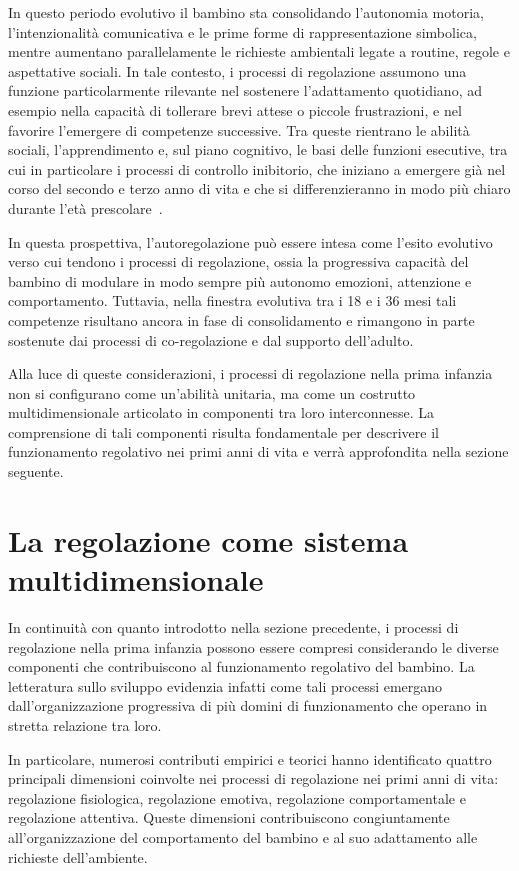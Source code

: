         In questo periodo evolutivo il bambino sta consolidando l'autonomia motoria, l'intenzionalità comunicativa e le prime forme di rappresentazione simbolica, mentre aumentano parallelamente le richieste ambientali legate a routine, regole e aspettative sociali. In tale contesto, i processi di regolazione assumono una funzione particolarmente rilevante nel sostenere l'adattamento quotidiano, ad esempio nella capacità di tollerare brevi attese o piccole frustrazioni, e nel favorire l'emergere di competenze successive. Tra queste rientrano le abilità sociali, l'apprendimento e, sul piano cognitivo, le basi delle funzioni esecutive, tra cui in particolare i processi di controllo inibitorio, che iniziano a emergere già nel corso del secondo e terzo anno di vita e che si differenzieranno in modo più chiaro durante l'età prescolare~\cite{diamond2013,blair2015,gandolfi2014}.

        In questa prospettiva, l'autoregolazione può essere intesa come l'esito evolutivo verso cui tendono i processi di regolazione, ossia la progressiva capacità del bambino di modulare in modo sempre più autonomo emozioni, attenzione e comportamento. Tuttavia, nella finestra evolutiva tra i 18 e i 36 mesi tali competenze risultano ancora in fase di consolidamento e rimangono in parte sostenute dai processi di co-regolazione e dal supporto dell'adulto.

        Alla luce di queste considerazioni, i processi di regolazione nella prima infanzia non si configurano come un'abilità unitaria, ma come un costrutto multidimensionale articolato in componenti tra loro interconnesse. La comprensione di tali componenti risulta fondamentale per descrivere il funzionamento regolativo nei primi anni di vita e verrà approfondita nella sezione seguente.

    \section{La regolazione come sistema multidimensionale}
    \label{sec:1_2}

        In continuità con quanto introdotto nella sezione precedente, i processi di regolazione nella prima infanzia possono essere compresi considerando le diverse componenti che contribuiscono al funzionamento regolativo del bambino. La letteratura sullo sviluppo evidenzia infatti come tali processi emergano dall'organizzazione progressiva di più domini di funzionamento che operano in stretta relazione tra loro.

        In particolare, numerosi contributi empirici e teorici hanno identificato quattro principali dimensioni coinvolte nei processi di regolazione nei primi anni di vita: regolazione fisiologica, regolazione emotiva, regolazione comportamentale e regolazione attentiva. Queste dimensioni contribuiscono congiuntamente all'organizzazione del comportamento del bambino e al suo adattamento alle richieste dell'ambiente.

